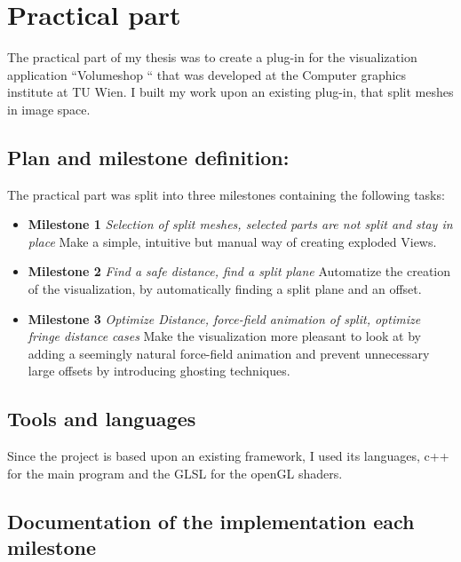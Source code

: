 \chapter{Practical part}
The practical part of my thesis was to create a plug-in for the visualization application ``Volumeshop `` that was developed at the Computer graphics institute at TU Wien. I built my work upon an existing plug-in, that split meshes in image space.
\section{Plan and milestone definition:}
The practical part was split into three milestones containing the following tasks:
\begin{itemize}
\item \textbf{Milestone 1} \emph{Selection of split meshes, selected parts are not split and stay in place} Make a simple, intuitive but manual way of creating exploded Views.
\item \textbf{Milestone 2} \emph{Find a safe distance, find a split plane} Automatize the creation of the visualization, by automatically finding a split plane and an offset.
\item \textbf{Milestone 3} \emph{Optimize Distance, force-field animation of split, optimize fringe distance cases} Make the visualization more pleasant to look at by adding a seemingly natural force-field animation and prevent unnecessary large offsets by introducing ghosting techniques.
\end{itemize}
\section {Tools and languages}
Since the project is based upon an existing framework, I used its languages, c++ for the main program and the GLSL for the openGL shaders.
\section{Documentation of the implementation each milestone}
